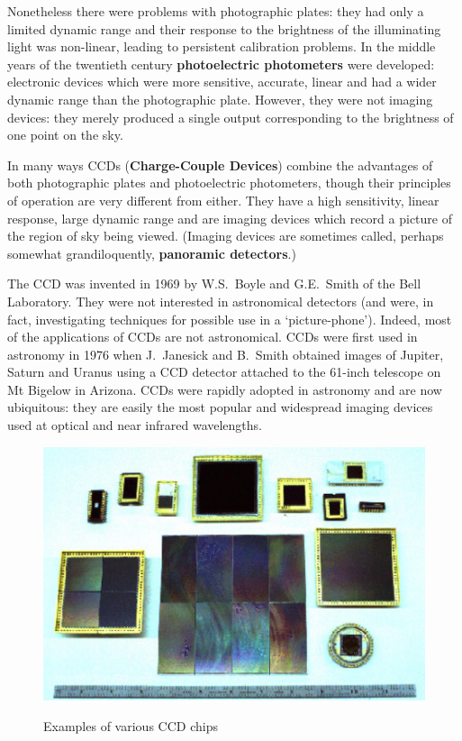 \documentclass[twoside,11pt]{starlink}
\begin{document}
Nonetheless there were problems with photographic plates: they had only
a limited dynamic range and their response to the brightness of the
illuminating light was non-linear, leading to persistent calibration
problems.  In the middle years of the twentieth century \textbf{photoelectric
photometers} were developed: electronic devices which were more sensitive,
accurate, linear and had a wider dynamic range than the photographic
plate.  However, they were not imaging devices: they merely produced a
single output corresponding to the brightness of one point on the sky.

In many ways CCDs (\textbf{Charge-Couple Devices}) combine the advantages
of both photographic plates and photoelectric photometers, though their
principles of operation are very different from either.  They have a high
sensitivity, linear response, large dynamic range and are imaging devices
which record a picture of the region of sky being viewed.  (Imaging devices
are sometimes called, perhaps somewhat grandiloquently, \textbf{panoramic
detectors}.)

The CCD was invented in 1969 by W.S.~Boyle and G.E.~Smith of the Bell
Laboratory.  They were not interested in astronomical detectors (and were,
in fact, investigating techniques for possible use in a `picture-phone').
Indeed, most of the applications of CCDs are not astronomical.  CCDs
were first used in astronomy in 1976 when J.~Janesick and B.~Smith
obtained images of Jupiter, Saturn and Uranus using a CCD detector
attached to the 61-inch telescope on Mt Bigelow in Arizona.  CCDs were
rapidly adopted in astronomy and are now ubiquitous: they are easily
the most popular and widespread imaging devices used at optical and
near infrared wavelengths.

\begin{figure}[htbp]
   \centering
   \includegraphics[totalheight=4in]{sc5_ccdlup}
   \begin{quote}
   \caption{Examples of various CCD chips
   \label{CCDLUP} }
   \end{quote}
\end{figure}
\end{document}
